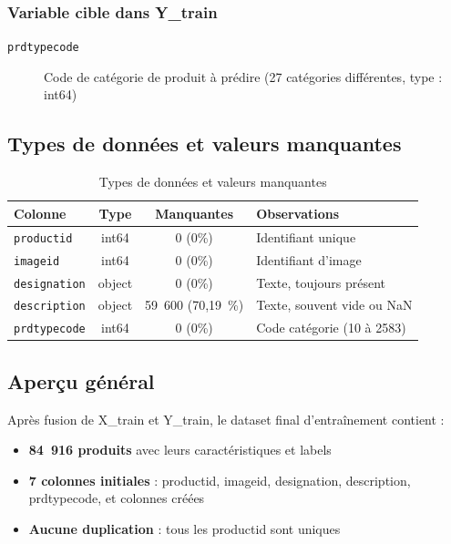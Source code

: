 \documentclass[12pt,a4paper]{article}
\begin{document}
\subsubsection{Variable cible dans Y\_train}

\begin{description}
    \item[\texttt{prdtypecode}] Code de catégorie de produit à prédire (27 catégories différentes, type : int64)
\end{description}

\subsection{Types de données et valeurs manquantes}

\begin{table}[H]
\centering
\begin{tabular}{@{}lccp{8cm}@{}}
\toprule
\textbf{Colonne} & \textbf{Type} & \textbf{Manquantes} & \textbf{Observations} \\
\midrule
\texttt{productid} & int64 & 0 (0\%) & Identifiant unique \\
\texttt{imageid} & int64 & 0 (0\%) & Identifiant d'image \\
\texttt{designation} & object & 0 (0\%) & Texte, toujours présent \\
\texttt{description} & object & 59~600 (70,19~\%) & Texte, souvent vide ou NaN \\
\texttt{prdtypecode} & int64 & 0 (0\%) & Code catégorie (10 à 2583) \\
\bottomrule
\end{tabular}
\caption{Types de données et valeurs manquantes}
\label{tab:types_donnees}
\end{table}

\subsection{Aperçu général}

Après fusion de X\_train et Y\_train, le dataset final d'entraînement contient :

\begin{itemize}
    \item \textbf{84~916 produits} avec leurs caractéristiques et labels
    \item \textbf{7 colonnes initiales} : productid, imageid, designation, description, prdtypecode, et colonnes créées
    \item \textbf{Aucune duplication} : tous les productid sont uniques
\end{itemize}
\end{document}
